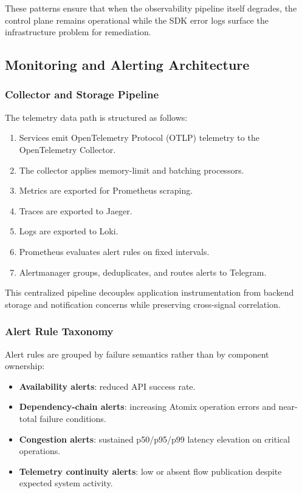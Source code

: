 These patterns ensure that when the observability pipeline itself degrades, the control plane remains operational while the SDK error logs surface the infrastructure problem for remediation.

\subsection{Monitoring and Alerting Architecture}

\subsubsection{Collector and Storage Pipeline}

The telemetry data path is structured as follows:

\begin{enumerate}
	\item Services emit OpenTelemetry Protocol (OTLP) telemetry to the OpenTelemetry Collector.
	\item The collector applies memory-limit and batching processors.
	\item Metrics are exported for Prometheus scraping.
	\item Traces are exported to Jaeger.
	\item Logs are exported to Loki.
	\item Prometheus evaluates alert rules on fixed intervals.
	\item Alertmanager groups, deduplicates, and routes alerts to Telegram.
\end{enumerate}

This centralized pipeline decouples application instrumentation from backend storage and notification concerns while preserving cross-signal correlation.

\subsubsection{Alert Rule Taxonomy}

Alert rules are grouped by failure semantics rather than by component ownership:

\begin{itemize}
	\item \textbf{Availability alerts}: reduced API success rate.
	\item \textbf{Dependency-chain alerts}: increasing Atomix operation errors and near-total failure conditions.
	\item \textbf{Congestion alerts}: sustained p50/p95/p99 latency elevation on critical operations.
	\item \textbf{Telemetry continuity alerts}: low or absent flow publication despite expected system activity.
\end{itemize}

